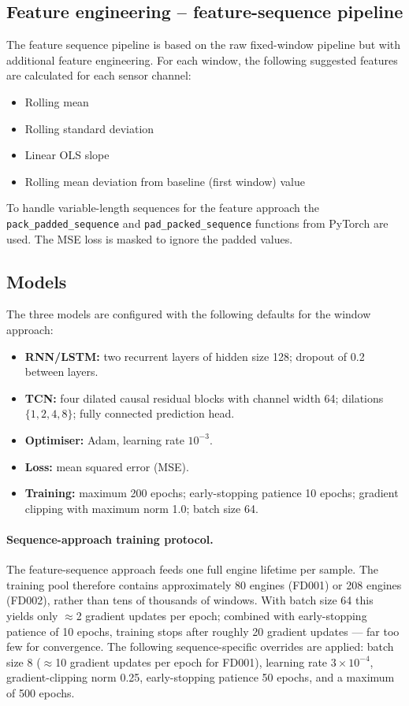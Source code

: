 \documentclass[a4paper,11pt]{article}
\begin{document}
\subsection{Feature engineering -- feature-sequence pipeline}
The feature sequence pipeline is based on the raw fixed-window pipeline but with additional feature engineering. For each window, the following suggested features are calculated for each sensor channel:
\begin{itemize}
    \item Rolling mean
    \item Rolling standard deviation
    \item Linear OLS slope
    \item Rolling mean deviation from baseline (first window) value
\end{itemize}

To handle variable-length sequences for the feature approach the \texttt{pack\_padded\_sequence} and \texttt{pad\_packed\_sequence} functions from PyTorch are used. The MSE loss is masked to ignore the padded values.

\subsection{Models}
\label{sec:models}
The three models are configured with the following defaults for the window approach:
\begin{itemize}
    \item \textbf{RNN/LSTM:} two recurrent layers of hidden size 128; dropout of 0.2 between layers.
    \item \textbf{TCN:} four dilated causal residual blocks with channel width 64; dilations $\{1,2,4,8\}$; fully connected prediction head.
    \item \textbf{Optimiser:} Adam, learning rate $10^{-3}$.
    \item \textbf{Loss:} mean squared error (MSE).
    \item \textbf{Training:} maximum 200 epochs; early-stopping patience 10 epochs; gradient clipping with maximum norm 1.0; batch size 64.
\end{itemize}

\paragraph{Sequence-approach training protocol.}
The feature-sequence approach feeds one full engine lifetime per sample.
The training pool therefore contains approximately 80 engines (FD001) or 208 engines (FD002), rather than tens of thousands of windows.
With batch size 64 this yields only $\approx$2 gradient updates per epoch; combined with early-stopping patience of 10 epochs, training stops after roughly 20 gradient updates — far too few for convergence.
The following sequence-specific overrides are applied: batch size 8 ($\approx$10 gradient updates per epoch for FD001), learning rate $3\times10^{-4}$, gradient-clipping norm 0.25, early-stopping patience 50 epochs, and a maximum of 500 epochs.
\end{document}
